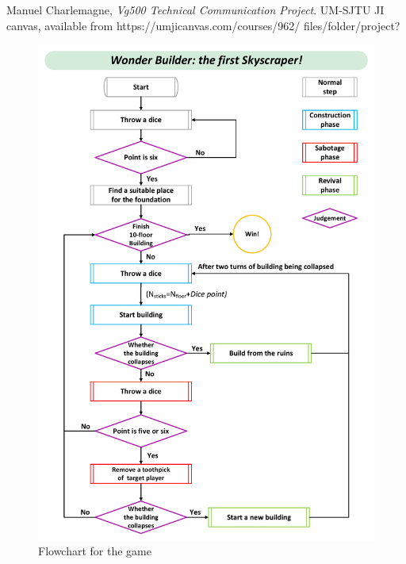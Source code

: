 \documentclass[a4paper, twocolumn, 12pt, twoside, english]{article}
\begin{document}
\begin{thebibliography}{}
Manuel Charlemagne, {\it Vg500 Technical Communication Project}. UM-SJTU JI canvas, available from https://umjicanvas.com/courses/962/ files/folder/project?

\end{thebibliography}
\newpage
\begin{figure}
	\centering
	\includegraphics[width=1\textwidth]{flowchart.pdf}
	\caption{Flowchart for the game}
	\label{fig:flc}	
\end{figure}
\end{document}
